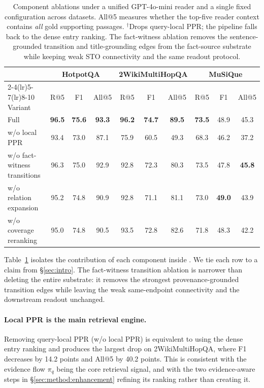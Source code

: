 \begin{table}[t]
\centering
\small
\setlength{\tabcolsep}{4pt}
\begin{tabular}{lccc ccc ccc}
\toprule
& \multicolumn{3}{c}{HotpotQA} &
\multicolumn{3}{c}{2WikiMultiHopQA} &
\multicolumn{3}{c}{MuSiQue} \\
\cmidrule(lr){2-4}\cmidrule(lr){5-7}\cmidrule(lr){8-10}
Variant & R@5 & F1 & All@5 & R@5 & F1 & All@5 & R@5 & F1 & All@5 \\
\midrule
Full \methodname{} & \textbf{96.5} & \textbf{75.6} & \textbf{93.3}
& \textbf{96.2} & \textbf{74.7} & \textbf{89.5}
& \textbf{73.5} & 48.9 & 45.3 \\
\midrule
w/o local PPR \rlap{$^{\dagger}$}            & 93.4 & 73.0 & 87.1 & 75.9 & 60.5 & 49.3 & 68.3 & 46.2 & 37.2 \\
w/o fact-witness transitions                  & 96.3 & 75.0 & 92.9 & 92.8 & 72.3 & 80.3 & 73.5 & 47.8 & \textbf{45.8} \\
w/o relation expansion                        & 95.2 & 74.8 & 90.9 & 92.8 & 71.1 & 81.1 & 73.0 & \textbf{49.0} & 43.9 \\
w/o coverage reranking                        & 95.0 & 74.8 & 90.5 & 93.5 & 72.8 & 82.6 & 71.8 & 48.3 & 42.2 \\
\bottomrule
\end{tabular}
\caption{Component ablations under a unified GPT-4o-mini reader and a
single fixed configuration across datasets. All@5 measures whether the
top-five reader context contains \emph{all} gold supporting passages.
$^{\dagger}$Drops query-local PPR; the pipeline falls back to the dense
entry ranking. The fact-witness ablation removes the
sentence-grounded transition and title-grounding edges from the
fact-source substrate while keeping weak STO connectivity and the same
readout protocol.}
\label{tab:ablation}
\end{table}

Table~\ref{tab:ablation} isolates the contribution of each component
inside \methodname{}. We tie each row to a claim from
\S\ref{sec:intro}. The fact-witness transition ablation is narrower
than deleting the entire substrate: it removes the strongest
provenance-grounded transition edges while leaving the weak
same-endpoint connectivity and the downstream readout unchanged.

\paragraph{Local PPR is the main retrieval engine.}
Removing query-local PPR (w/o local PPR) is equivalent to using the
dense entry ranking and produces the largest drop on 2WikiMultiHopQA,
where F1 decreases by 14.2 points and All@5 by 40.2 points. This is
consistent with the evidence flow $\pi_q$ being the core retrieval
signal, and with the two evidence-aware steps in
\S\ref{sec:method:enhancement} refining its ranking rather than creating it.

